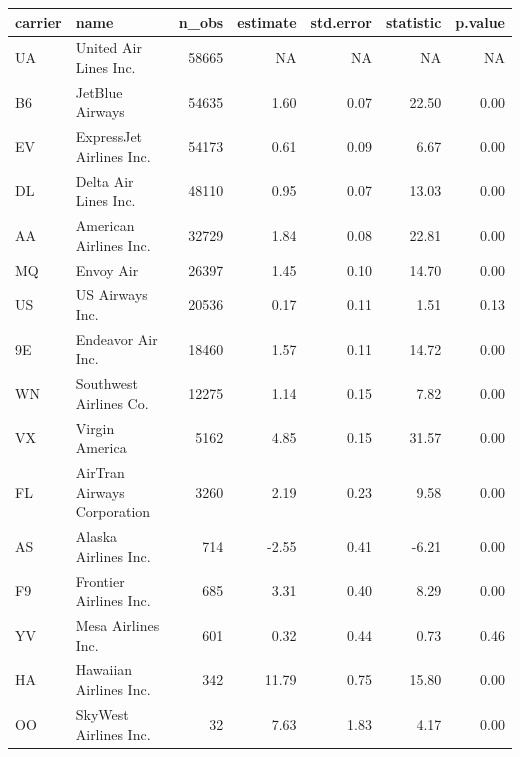 \documentclass[]{book}
\newenvironment{Shaded}{\begin{snugshade}}{\end{snugshade}}
\newcommand{\KeywordTok}[1]{\textcolor[rgb]{0.13,0.29,0.53}{\textbf{{#1}}}}
\newcommand{\DataTypeTok}[1]{\textcolor[rgb]{0.13,0.29,0.53}{{#1}}}
\newcommand{\StringTok}[1]{\textcolor[rgb]{0.31,0.60,0.02}{{#1}}}
\newcommand{\NormalTok}[1]{{#1}}
\theoremstyle{definition}
\theoremstyle{definition}
\theoremstyle{remark}
\begin{document}
\begin{tabular}{l|l|r|r|r|r|r}
\hline
carrier & name & n\_obs & estimate & std.error & statistic & p.value\\
\hline
UA & United Air Lines Inc. & 58665 & NA & NA & NA & NA\\
\hline
B6 & JetBlue Airways & 54635 & 1.60 & 0.07 & 22.50 & 0.00\\
\hline
EV & ExpressJet Airlines Inc. & 54173 & 0.61 & 0.09 & 6.67 & 0.00\\
\hline
DL & Delta Air Lines Inc. & 48110 & 0.95 & 0.07 & 13.03 & 0.00\\
\hline
AA & American Airlines Inc. & 32729 & 1.84 & 0.08 & 22.81 & 0.00\\
\hline
MQ & Envoy Air & 26397 & 1.45 & 0.10 & 14.70 & 0.00\\
\hline
US & US Airways Inc. & 20536 & 0.17 & 0.11 & 1.51 & 0.13\\
\hline
9E & Endeavor Air Inc. & 18460 & 1.57 & 0.11 & 14.72 & 0.00\\
\hline
WN & Southwest Airlines Co. & 12275 & 1.14 & 0.15 & 7.82 & 0.00\\
\hline
VX & Virgin America & 5162 & 4.85 & 0.15 & 31.57 & 0.00\\
\hline
FL & AirTran Airways Corporation & 3260 & 2.19 & 0.23 & 9.58 & 0.00\\
\hline
AS & Alaska Airlines Inc. & 714 & -2.55 & 0.41 & -6.21 & 0.00\\
\hline
F9 & Frontier Airlines Inc. & 685 & 3.31 & 0.40 & 8.29 & 0.00\\
\hline
YV & Mesa Airlines Inc. & 601 & 0.32 & 0.44 & 0.73 & 0.46\\
\hline
HA & Hawaiian Airlines Inc. & 342 & 11.79 & 0.75 & 15.80 & 0.00\\
\hline
OO & SkyWest Airlines Inc. & 32 & 7.63 & 1.83 & 4.17 & 0.00\\
\hline
\end{tabular}

\begin{Shaded}
\end{Shaded}
\end{document}
